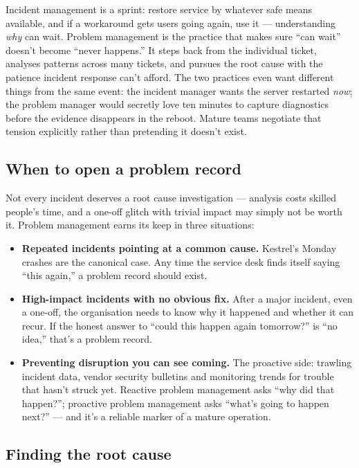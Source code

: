 Incident management is a sprint: restore service by whatever safe means available, and if a workaround gets users going again, use it — understanding \emph{why} can wait. Problem management is the practice that makes sure ``can wait'' doesn't become ``never happens.'' It steps back from the individual ticket, analyses patterns across many tickets, and pursues the root cause with the patience incident response can't afford. The two practices even want different things from the same event: the incident manager wants the server restarted \emph{now}; the problem manager would secretly love ten minutes to capture diagnostics before the evidence disappears in the reboot. Mature teams negotiate that tension explicitly rather than pretending it doesn't exist.



\subsection{When to open a problem record}


Not every incident deserves a root cause investigation — analysis costs skilled people's time, and a one-off glitch with trivial impact may simply not be worth it. Problem management earns its keep in three situations:


\begin{itemize}[leftmargin=*]
\item \textbf{Repeated incidents pointing at a common cause.} Kestrel's Monday crashes are the canonical case. Any time the service desk finds itself saying ``this again,'' a problem record should exist.
\item \textbf{High-impact incidents with no obvious fix.} After a major incident, even a one-off, the organisation needs to know why it happened and whether it can recur. If the honest answer to ``could this happen again tomorrow?'' is ``no idea,'' that's a problem record.
\item \textbf{Preventing disruption you can see coming.} The proactive side: trawling incident data, vendor security bulletins and monitoring trends for trouble that hasn't struck yet. Reactive problem management asks ``why did that happen?''; proactive problem management asks ``what's going to happen next?'' — and it's a reliable marker of a mature operation.
\end{itemize}


\subsection{Finding the root cause}


